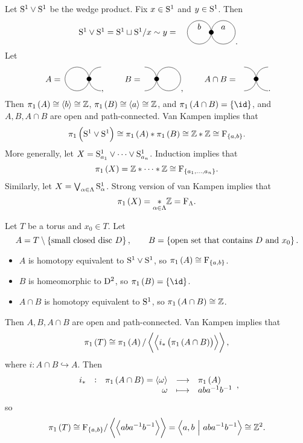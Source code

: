 \begin{example*}
Let $ \S^1 \vee \S^1 $ be the wedge product. Fix $ x \in \S^1 $ and $ y \in \S^1 $. Then
$$
\begin{tikzpicture}
\draw (-3.5, 0) node{$ \S^1 \vee \S^1 = \S^1 \sqcup \S^1 / x \sim y = $};
\fill (0, 0) circle (0.1);
\draw (-0.5, 0) circle (0.5) node[above]{$ b $};
\draw (0.5, 0) circle (0.5) node[above]{$ a $};
\end{tikzpicture}.
$$
Let
$$
\begin{tikzpicture}
\draw (-1.5, 0) node{$ A = $};
\fill (0, 0) circle (0.1);
\draw (-0.5, 0) circle (0.5);
\draw (0.5, 0.5) arc (90:270:0.5);
\end{tikzpicture},
\qquad
\begin{tikzpicture}
\draw (-1, 0) node{$ B = $};
\fill (0, 0) circle (0.1);
\draw (-0.5, 0.5) arc (90:-90:0.5);
\draw (0.5, 0) circle (0.5);
\end{tikzpicture},
\qquad
\begin{tikzpicture}
\draw (-1.5, 0) node{$ A \cap B = $};
\fill (0, 0) circle (0.1);
\draw (-0.5, 0.5) arc (90:-90:0.5);
\draw (0.5, 0.5) arc (90:270:0.5);
\end{tikzpicture}.
$$
Then $ \pi_1\br{A} \cong \abr{b} \cong \ZZ $, $ \pi_1\br{B} \cong \abr{a} \cong \ZZ $, and $ \pi_1\br{A \cap B} = \cbr{\id} $, and $ A, B, A \cap B $ are open and path-connected. Van Kampen implies that
$$ \pi_1\br{\S^1 \vee \S^1} \cong \pi_1\br{A} * \pi_1\br{B} \cong \ZZ * \ZZ \cong \F_{\cbr{a, b}}. $$
More generally, let $ X = \S_{a_1}^1 \vee \dots \vee \S_{a_n}^1 $. Induction implies that
$$ \pi_1\br{X} = \ZZ * \dots * \ZZ \cong \F_{\cbr{a_1, \dots, a_n}}. $$
Similarly, let $ X = \bigvee_{\alpha \in \Lambda} \S_\alpha^1 $. Strong version of van Kampen implies that
$$ \pi_1\br{X} = \underset{\alpha \in \Lambda}{*} \ZZ = \F_\Lambda. $$
\end{example*}

\pagebreak

\begin{example*}
Let $ T $ be a torus and $ x_0 \in T $. Let
$$ A = T \setminus \cbr{\text{small closed disc} \ D}, \qquad B = \cbr{\text{open set that contains} \ D \ \text{and} \ x_0}. $$
\begin{itemize}
\item $ A $ is homotopy equivalent to $ \S^1 \vee \S^1 $, so $ \pi_1\br{A} \cong \F_{\cbr{a, b}} $.
\item $ B $ is homeomorphic to $ \D^2 $, so $ \pi_1\br{B} = \cbr{\id} $.
\item $ A \cap B $ is homotopy equivalent to $ \S^1 $, so $ \pi_1\br{A \cap B} \cong \ZZ $.
\end{itemize}
Then $ A, B, A \cap B $ are open and path-connected. Van Kampen implies that
$$ \pi_1\br{T} \cong \pi_1\br{A} / \abr{\abr{i_*\br{\pi_1\br{A \cap B}}}}, $$
where $ i : A \cap B \hookrightarrow A $. Then
$$ \function[i_*]{\pi_1\br{A \cap B} = \abr{\omega}}{\pi_1\br{A}}{\omega}{aba^{-1}b^{-1}}, $$
so
$$ \pi_1\br{T} \cong \F_{\cbr{a, b}} / \abr{\abr{aba^{-1}b^{-1}}} = \abr{a, b \st aba^{-1}b^{-1}} \cong \ZZ^2. $$
\end{example*}

